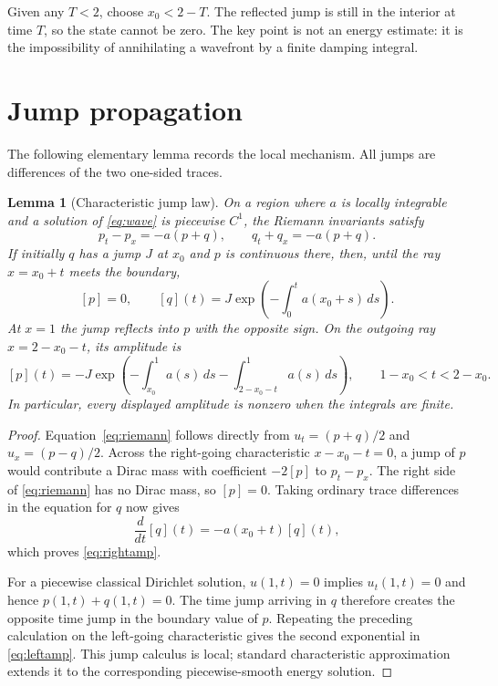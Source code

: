 \documentclass[11pt]{article}
\newtheorem{lemma}[theorem]{Lemma}
\begin{document}
Given any $T<2$, choose $x_0<2-T$.  The reflected jump is still in the
interior at time $T$, so the state cannot be zero.  The key point is not an
energy estimate: it is the impossibility of annihilating a wavefront by a
finite damping integral.

\section{Jump propagation}

The following elementary lemma records the local mechanism.  All jumps are
differences of the two one-sided traces.

\begin{lemma}[Characteristic jump law]\label{lem:jump}
On a region where $a$ is locally integrable and a solution of
\eqref{eq:wave} is piecewise $C^1$, the Riemann invariants satisfy
\begin{equation}\label{eq:riemann}
 p_t-p_x=-a(p+q),\qquad q_t+q_x=-a(p+q).
\end{equation}
If initially $q$ has a jump $J$ at $x_0$ and $p$ is continuous there, then,
until the ray $x=x_0+t$ meets the boundary,
\begin{equation}\label{eq:rightamp}
 [p]=0,\qquad
 [q](t)=J\exp\!\left(-\int_0^t a(x_0+s)\,ds\right).
\end{equation}
At $x=1$ the jump reflects into $p$ with the opposite sign.  On the outgoing
ray $x=2-x_0-t$, its amplitude is
\begin{equation}\label{eq:leftamp}
 [p](t)=-J\exp\!\left(
 -\int_{x_0}^{1}a(s)\,ds
 -\int_{2-x_0-t}^{1}a(s)\,ds\right),
 \qquad 1-x_0<t<2-x_0.
\end{equation}
In particular, every displayed amplitude is nonzero when the integrals are
finite.
\end{lemma}

\begin{proof}
Equation~\eqref{eq:riemann} follows directly from
$u_t=(p+q)/2$ and $u_x=(p-q)/2$.  Across the right-going characteristic
$x-x_0-t=0$, a jump of $p$ would contribute a Dirac mass with coefficient
$-2[p]$ to $p_t-p_x$.  The right side of \eqref{eq:riemann} has no Dirac
mass, so $[p]=0$.  Taking ordinary trace differences in the equation for
$q$ now gives
\[
 \frac{d}{dt}[q](t)=-a(x_0+t)[q](t),
\]
which proves \eqref{eq:rightamp}.

For a piecewise classical Dirichlet solution, $u(1,t)=0$ implies
$u_t(1,t)=0$ and hence $p(1,t)+q(1,t)=0$.  The time jump arriving in $q$
therefore creates the opposite time jump in the boundary value of $p$.
Repeating the preceding calculation on the left-going characteristic gives
the second exponential in \eqref{eq:leftamp}.  This jump calculus is local;
standard characteristic approximation extends it to the corresponding
piecewise-smooth energy solution.
\end{proof}
\end{document}
